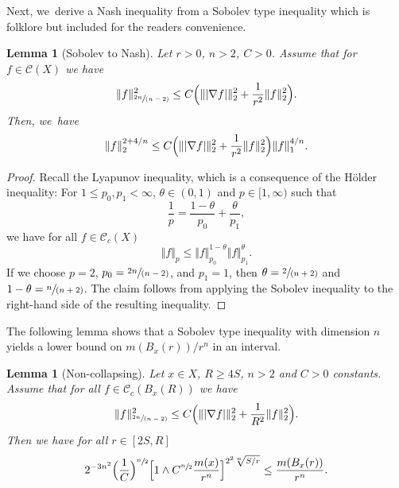 \documentclass[10pt]{amsart}
\newcommand{\spfrac}[2]{\sfrac{#1}{(#2)}}
\theoremstyle{plain}
\newtheorem{lemma}[theorem]{Lemma}
\theoremstyle{definition}
\newcommand{\cC}{\mathcal{C}}
\begin{document}
Next, we~derive a Nash inequality from a Sobolev type inequality which is folklore {but} included for the readers convenience.

\begin{lemma}[Sobolev to Nash]\label{lem:StoN}
Let $r>0$, $n>2$, {$ C>0 $}. Assume that for $f\in \cC({X})$ we have
\[
\Vert f\Vert_{\spfrac{2n}{n-2}}^2\leq C\Bigl(\Vert |\nabla f|\Vert_2^2+\frac{1}{r^2}\Vert f\Vert_2^2\Bigr).
\]
Then, we~have
\[
\Vert f\Vert_2^{2+4/n}\leq C \Bigl(\Vert |\nabla f|\Vert_2^2+\frac{1}{r^2}\Vert f\Vert_2^2\Bigr)\Vert f\Vert_1^{4/n}.
\]
\end{lemma}

\begin{proof}
Recall the Lyapunov inequality, which is a consequence of the Hölder inequality: For $1\leq p_0,p_1<\infty$, $\theta\in(0,1)$ and $p\in [1,\infty)$ such that
\[
\frac{1}{p}=\frac{1-\theta}{p_0}+\frac{\theta}{p_1},
\]
we have for all $f\in\cC_c(X)$
\[
\Vert f\Vert_p\leq \Vert f\Vert_{p_0}^{1-\theta}\Vert f\Vert_{p_1}^\theta.
\]
If we choose $p=2$, $p_0=\spfrac{2n}{n-2}$, and $p_1=1$, then $\theta=\spfrac{2}{n+2}$ and $1-\theta=\spfrac{n}{n+2}$. The claim follows from applying the Sobolev inequality to the right-hand side of the resulting inequality.
\end{proof}

The following lemma shows that a Sobolev type inequality with dimension $ n $ yields a lower bound on $ m(B_{x}(r))/r^n $ in an interval.

\begin{lemma}[Non-collapsing]\label{lem:asnoncoll}Let $x\in X$, $R {\ge 4S}$,
$n>2$ and $C>0$ constants. Assume that for all $f\in \cC_{c}(B_x(R))$ we have
\[
\Vert f\Vert_{\spfrac{2n}{n-2}}^2\leq C\Bigl(\Vert| \nabla f|\Vert_2^2+\frac{1}{R^2}\Vert f\Vert_2^2\Bigr).
\]
Then we have for all $r\in[2S,R]$
\[
2^{-{3}n^2}\Bigl(\frac{1}{C}\Bigr)^{\sfrac{n}{2}}
\Bigl[1\wedge C^{\sfrac{n}{2}}\frac{m(x)}{r^{n}}\Bigr]^{2^{2}\sqrt[n]{{S}/{r}}}
\leq \frac{m(B_x(r))}{r^{n}}.
\]
\end{lemma}
\end{document}
